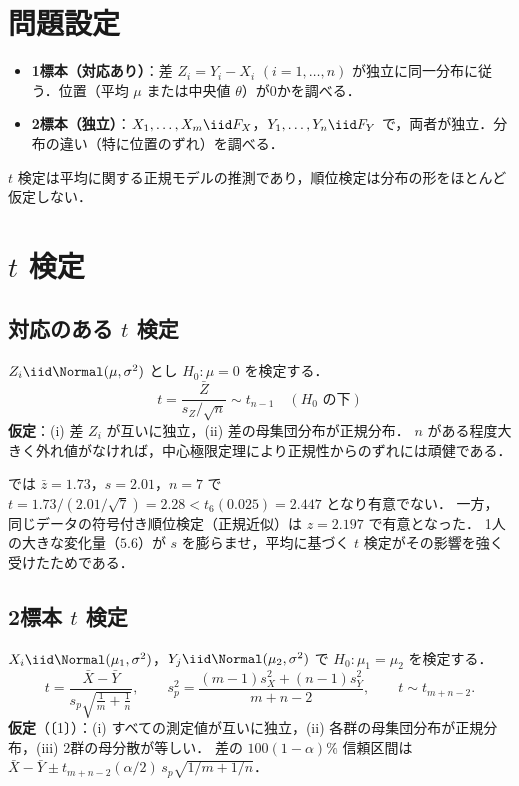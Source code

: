 \section{問題設定}\label{sec:03-setting}
\begin{itemize}
\item \textbf{1標本（対応あり）}：差 $Z_i=Y_i-X_i$ $(i=1,\dots,n)$ が独立に同一分布に従う．位置（平均 $\mu$ または中央値 $\theta$）が0かを調べる．
\item \textbf{2標本（独立）}：$X_1,\dots,X_m\iid F_X$，$Y_1,\dots,Y_n\iid F_Y$ で，両者が独立．分布の違い（特に位置のずれ）を調べる．
\end{itemize}
$t$ 検定は平均に関する正規モデルの推測であり，順位検定は分布の形をほとんど仮定しない．

\section{\texorpdfstring{$t$}{t} 検定}\label{sec:03-t}
\subsection{対応のある \texorpdfstring{$t$}{t} 検定}\label{subsec:03-pairedt}
$Z_i\iid\Normal(\mu,\sigma^2)$ とし $H_0:\mu=0$ を検定する．
\begin{equation}
t=\frac{\bar Z}{s_Z/\sqrt n}\sim t_{n-1}\quad(H_0\text{ の下})\label{eq:03-pairedt}
\end{equation}
\textbf{仮定}：(i) 差 $Z_i$ が互いに独立，(ii) 差の母集団分布が正規分布．
$n$ がある程度大きく外れ値がなければ，中心極限定理により正規性からのずれには頑健である．

 では $\bar z=1.73$，$s=2.01$，$n=7$ で $t=1.73/(2.01/\sqrt7)=2.28<t_6(0.025)=2.447$ となり有意でない．
一方，同じデータの符号付き順位検定（正規近似）は $z=2.197$ で有意となった．
1人の大きな変化量（$5.6$）が $s$ を膨らませ，平均に基づく $t$ 検定がその影響を強く受けたためである．

\subsection{2標本 \texorpdfstring{$t$}{t} 検定}\label{subsec:03-twot}
$X_i\iid\Normal(\mu_1,\sigma^2)$，$Y_j\iid\Normal(\mu_2,\sigma^2)$ で $H_0:\mu_1=\mu_2$ を検定する．
\begin{equation}
t=\frac{\bar X-\bar Y}{s_p\sqrt{\frac1m+\frac1n}},\qquad s_p^2=\frac{(m-1)s_X^2+(n-1)s_Y^2}{m+n-2},\qquad t\sim t_{m+n-2}.\label{eq:03-twot}
\end{equation}
\textbf{仮定}（〔1〕）：(i) すべての測定値が互いに独立，(ii) 各群の母集団分布が正規分布，(iii) 2群の母分散が等しい．
差の $100(1-\alpha)\%$ 信頼区間は $\bar X-\bar Y\pm t_{m+n-2}(\alpha/2)\,s_p\sqrt{1/m+1/n}$．

